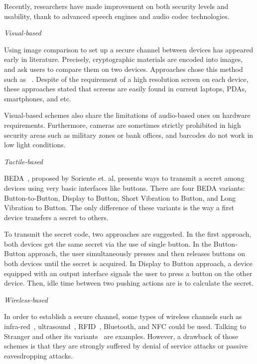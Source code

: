 Recently, researchers have made improvement on both security levels and usability, thank to advanced speech engines and audio codec technologies. 

\emph{Visual-based}

Using image comparison to set up a secure channel between devices has appeared early in literature. Precisely, cryptographic materials are encoded into images, and ask users to compare them on two devices. Approaches chose this method such as ~\cite{Goodrich:2009:UAS:1509221.1509226,1425062,Perrig99hashvisualization,Ellison:2003:PSG:950191.950195,1624021}. Despite of the requirement of a high resolution screen on each device, these approaches stated that screens are easily found in current laptops, PDAs, smartphones, and etc. 

Visual-based schemes also share the limitations of audio-based ones on hardware requirements. Furthermore, cameras are sometimes strictly prohibited in high security areas such as military zones or bank offices, and barcodes do not work in low light conditions. 

\emph{Tactile-based}

BEDA~\cite{Soriente07beda:button-enabled}, proposed by Soriente et. al, presents ways to transmit a secret among devices using very basic interfaces like buttons. There are four BEDA variants: Button-to-Button, Display to Button, Short Vibration to Button, and Long Vibration to Button. The only difference of these variants is the way a first device transfers a secret to others.

To transmit the secret code, two approaches are suggested. In the first approach, both devices get the same secret via the use of single button. In the Button-Button approach, the user simultaneously presses and then releases buttons on both devices until the secret is acquired. In Display to Button approach, a device equipped with an output interface signals the user to press a button on the other device. Then, idle time between two pushing actions are is to calculate the secret. 

\emph{Wireless-based}

In order to establish a secure channel, some types of wireless channels such as infra-red~\cite{5654588}, ultrasound~\cite{Mayrhofer06anauthentication}, RFID~\cite{Amariucai:2012aa}, Bluetooth, and NFC could be used. Talking to Stranger and other its variants~\cite{5654588,Mayrhofer06anauthentication,4159919,Amariucai:2012aa} are examples. However, a drawback of those schemes is that they are strongly suffered by denial of service attacks or passive eavesdropping attacks.


